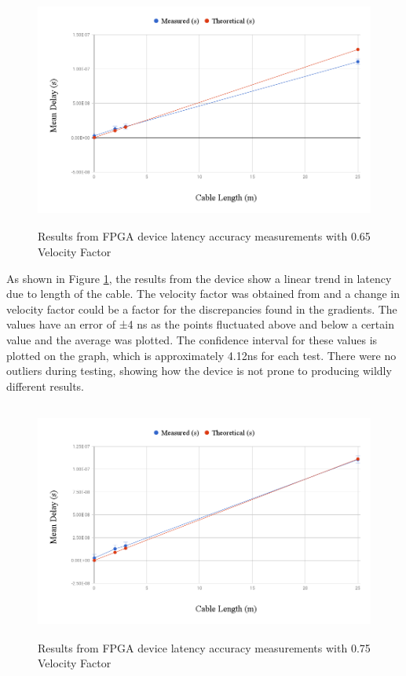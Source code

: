 \begin{figure}[H]
    \begin{center}
        \includegraphics[keepaspectratio,height=7.8cm]{Images/CableTesting}
        \caption{Results from FPGA device latency accuracy measurements with 0.65 Velocity Factor}
        \label{fig:cableTesting}
    \end{center}
\end{figure}

As shown in Figure \ref{fig:cableTesting}, the results from the device show a linear trend in latency due to length 
of the cable. The velocity factor was obtained from \cite{VelFactor} and a change in velocity factor could be a factor 
for the discrepancies found in the gradients. The values have an error of ±4 ns as the points fluctuated above and 
below a certain value and the average was plotted. The confidence interval for these values is plotted on the graph, 
which is approximately 4.12ns for each test. There were no outliers during testing, showing how the device is 
not prone to producing wildly different results.

\begin{figure}[H]
    \begin{center}
        \includegraphics[keepaspectratio,height=7.8cm]{Images/CableTesting075}
        \caption{Results from FPGA device latency accuracy measurements with 0.75 Velocity Factor}
        \label{fig:cableTesting075}
    \end{center}
\end{figure}

